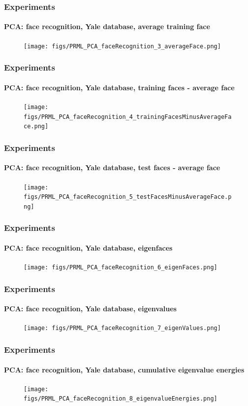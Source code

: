 \begin{frame}
\frametitle{Experiments}
\framesubtitle{PCA: face recognition, Yale database, average training face}
\logoCSIPCPL\mypagenum	
	\begin{figure}
		\texttt{[image: figs/PRML\_PCA\_faceRecognition\_3\_averageFace.png]}
	\end{figure}
\end{frame}


\begin{frame}
\frametitle{Experiments}
\framesubtitle{PCA: face recognition, Yale database, training faces - average face}
\logoCSIPCPL\mypagenum	
	\begin{figure}
		\texttt{[image: figs/PRML\_PCA\_faceRecognition\_4\_trainingFacesMinusAverageFace.png]}
	\end{figure}
\end{frame}

\begin{frame}
\frametitle{Experiments}
\framesubtitle{PCA: face recognition, Yale database, test faces - average face}
\logoCSIPCPL\mypagenum	
	\begin{figure}
		\texttt{[image: figs/PRML\_PCA\_faceRecognition\_5\_testFacesMinusAverageFace.png]}
	\end{figure}
\end{frame}

\begin{frame}
\frametitle{Experiments}
\framesubtitle{PCA: face recognition, Yale database, eigenfaces}
\logoCSIPCPL\mypagenum	
	\begin{figure}
		\texttt{[image: figs/PRML\_PCA\_faceRecognition\_6\_eigenFaces.png]}
	\end{figure}
\end{frame}


\begin{frame}
\frametitle{Experiments}
\framesubtitle{PCA: face recognition, Yale database, eigenvalues}
\logoCSIPCPL\mypagenum	
	\begin{figure}
		\texttt{[image: figs/PRML\_PCA\_faceRecognition\_7\_eigenValues.png]}
	\end{figure}
\end{frame}


\begin{frame}
\frametitle{Experiments}
\framesubtitle{PCA: face recognition, Yale database, cumulative eigenvalue energies}
\logoCSIPCPL\mypagenum	
	\begin{figure}
		\texttt{[image: figs/PRML\_PCA\_faceRecognition\_8\_eigenvalueEnergies.png]}
	\end{figure}
\end{frame}


